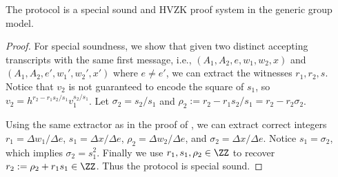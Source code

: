 
\begin{theorem}[\zkposqs]\label{thm:posqs}
    The protocol \zkposqs is a special sound and HVZK proof system in the generic group model.
\end{theorem}
\begin{proof}
    For special soundness, we show that given two distinct accepting transcripts with the same first message, i.e., $(A_1, A_2, e, w_1,\allowbreak w_2, x)$ and $(A_1, A_2, e', w_1',\allowbreak w_2', x')$ where $e \neq e'$, we can extract the witnesses $r_1, r_2, s$. Notice that $v_2$ is not guaranteed to encode the square of $s_1$, so $v_2 = h^{r_2 - r_1 s_2/s_1} v_1^{s_2/s_1}$. Let $\sigma_2 = s_2/s_1$ and $\rho_2 := r_2 - r_1 s_2/s_1 = r_2 - r_2 \sigma_2$. 

    Using the same extractor as in the proof of , we can extract correct integers $r_1 = \Delta w_1 / \Delta e$, $s_1 = \Delta x/\Delta e$, $\rho_2 = \Delta w_2 / \Delta e$, and $\sigma_2 = \Delta x/\Delta e$. Notice $s_1 = \sigma_2$, which implies $\sigma_2 = s_1^2$. Finally we use $r_1, s_1, \rho_2 \in \ZZ$ to recover $r_2 := \rho_2 + r_1 s_1 \in \ZZ$. 
    Thus the protocol is special sound.
    

\end{proof}
